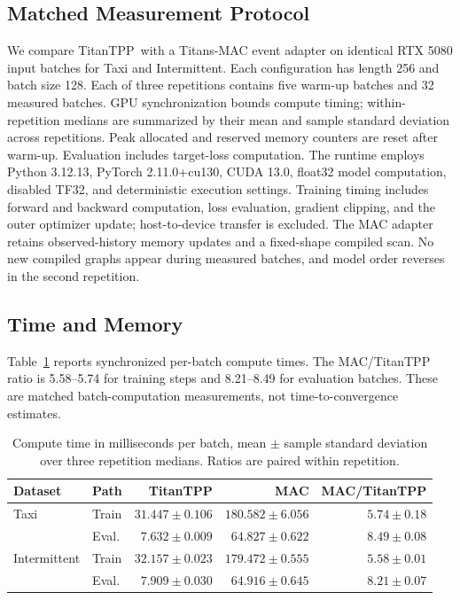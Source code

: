 \documentclass[runningheads]{llncs}
\newcommand{\method}{TitanTPP}
\begin{document}
\subsection{Matched Measurement Protocol}
We compare \method\ with a Titans-MAC event adapter on identical RTX 5080
input batches for Taxi and Intermittent. Each configuration has length 256
and batch size 128. Each of three repetitions contains five warm-up batches
and 32 measured batches. GPU synchronization bounds compute timing;
within-repetition medians are summarized by their mean and sample standard
deviation across repetitions. Peak allocated and reserved memory counters
are reset after warm-up. Evaluation includes target-loss computation. The
runtime employs Python 3.12.13, PyTorch 2.11.0+cu130, CUDA 13.0, float32
model computation, disabled TF32, and deterministic execution settings.
Training timing includes forward and backward computation, loss evaluation,
gradient clipping, and the outer optimizer update; host-to-device transfer
is excluded. The MAC adapter retains observed-history memory updates and
a fixed-shape compiled scan. No new compiled graphs appear during measured
batches, and model order reverses in the second repetition.

\subsection{Time and Memory}
Table~\ref{tab:cost} reports synchronized per-batch compute times. The
MAC/TitanTPP ratio is 5.58--5.74 for training steps and 8.21--8.49 for
evaluation batches. These are matched batch-computation measurements, not
time-to-convergence estimates.

\begin{table}[t]
\caption{Compute time in milliseconds per batch, mean $\pm$ sample
standard deviation over three repetition medians. Ratios are paired within
repetition.}
\label{tab:cost}\centering\small
\begin{tabular}{llrrr}
\toprule
Dataset & Path & TitanTPP & MAC & MAC/TitanTPP\\
\midrule
Taxi & Train & $31.447\pm0.106$ & $180.582\pm6.056$ & $5.74\pm0.18$\\
 & Eval. & $7.632\pm0.009$ & $64.827\pm0.622$ & $8.49\pm0.08$\\
Intermittent & Train & $32.157\pm0.023$ & $179.472\pm0.555$ & $5.58\pm0.01$\\
 & Eval. & $7.909\pm0.030$ & $64.916\pm0.645$ & $8.21\pm0.07$\\
\bottomrule
\end{tabular}
\end{table}
\end{document}
